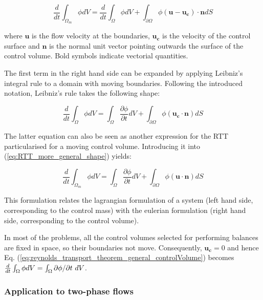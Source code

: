 \begin{equation}
\label{eq:RTT_more_general_shape}
\frac{d}{dt} \int_{\Omega_m} \phi  dV =  \frac{ d}{dt} \int_\Omega \phi dV + \int_{\partial \Omega} \phi  \left( \boldsymbol{u} - \boldsymbol{u_c} \right) \cdot \boldsymbol{n}  dS
\end{equation}

where $\boldsymbol{u}$ is the flow velocity at the boundaries, $\boldsymbol{u_c}$ is the velocity of the control surface and $\boldsymbol{n}$ is the normal unit vector pointing outwards the surface of the control volume. Bold symbols indicate vectorial quantities. 

The first term in the right hand side can be expanded by applying Leibniz's integral rule to a domain with moving boundaries. Following the introduced notation, Leibniz's rule takes the following shape:

\begin{equation}
\label{eq:reynolds_transport_theorem_general_controlVolume}
\frac{d}{dt} \int_\Omega \phi dV =  \int_\Omega \frac{\partial \phi}{\partial t} dV + \int_{\partial \Omega} \phi \left( \boldsymbol{u_c} \cdot \boldsymbol{n} \right) dS
\end{equation}

The latter equation can also be seen as another expression for the RTT particularised for a moving control volume. Introducing it into (\ref{eq:RTT_more_general_shape}) yields:


\begin{equation}
\label{eq:reynolds_transport_theorem_general_controlMass}
\boxed{
\frac{d}{dt} \int_{\Omega_m} \phi  dV = \int_\Omega \frac{\partial \phi}{\partial t} dV + \int_{\partial \Omega} \phi   \left( \boldsymbol{u} \cdot \boldsymbol{n} \right) dS
}
\end{equation}

This formulation relates the lagrangian formulation of a system (left hand side, corresponding to the control mass) with the eulerian formulation (right hand side, corresponding to the control volume). 

In most of the problems, all the control volumes selected for performing balances are fixed in space, so their boundaries not move. Consequently, $\boldsymbol{u_c} = 0$ and hence Eq. (\ref{eq:reynolds_transport_theorem_general_controlVolume}) becomes $\frac{d}{dt} \int_{\scriptsize{\Omega}} \phi dV =  \int_{\scriptsize{\Omega}} \partial \phi/\partial t ~ dV$.

\subsubsection*{Application to two-phase flows}
	\label{subsec:RTT_applied_to_TPS_with_interface}

